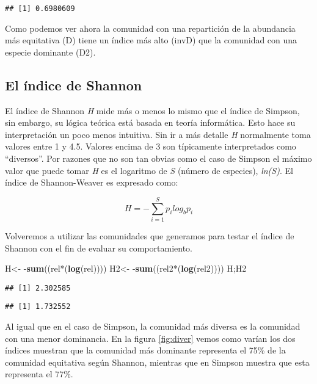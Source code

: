 \documentclass[]{book}
\newenvironment{Shaded}{\begin{snugshade}}{\end{snugshade}}
\newcommand{\KeywordTok}[1]{\textcolor[rgb]{0.13,0.29,0.53}{\textbf{{#1}}}}
\newcommand{\StringTok}[1]{\textcolor[rgb]{0.31,0.60,0.02}{{#1}}}
\newcommand{\NormalTok}[1]{{#1}}
\begin{document}
\begin{verbatim}
## [1] 0.6980609
\end{verbatim}

Como podemos ver ahora la comunidad con una repartición de la abundancia
más equitativa (D) tiene un índice más alto (invD) que la comunidad con
una especie dominante (D2).

\subsection{El índice de Shannon}\label{el-indice-de-shannon}

El índice de Shannon \emph{H} mide más o menos lo mismo que el índice de
Simpson, sin embargo, su lógica teórica está basada en teoría
informática. Esto hace su interpretación un poco menos intuitiva. Sin ir
a más detalle \emph{H} normalmente toma valores entre 1 y 4.5. Valores
encima de 3 son típicamente interpretados como ``diversos''. Por razones
que no son tan obvias como el caso de Simpson el máximo valor que puede
tomar \emph{H} es el logaritmo de \emph{S} (número de especies),
\emph{ln(S)}. El índice de Shannon-Weaver es expresado como:

\[
H=-\sum_{i=1}^S p_ilog_bp_i
\]

Volveremos a utilizar las comunidades que generamos para testar el
índice de Shannon con el fin de evaluar su comportamiento.

\begin{Shaded}
\begin{Highlighting}[]
\NormalTok{H<-}\StringTok{ }\NormalTok{-}\KeywordTok{sum}\NormalTok{((rel*(}\KeywordTok{log}\NormalTok{(rel))))}
\NormalTok{H2<-}\StringTok{ }\NormalTok{-}\KeywordTok{sum}\NormalTok{((rel2*(}\KeywordTok{log}\NormalTok{(rel2))))}
\NormalTok{H;H2}
\end{Highlighting}
\end{Shaded}

\begin{verbatim}
## [1] 2.302585
\end{verbatim}

\begin{verbatim}
## [1] 1.732552
\end{verbatim}

Al igual que en el caso de Simpson, la comunidad más diversa es la
comunidad con una menor dominancia. En la figura \ref{fig:diver} vemos
como varían los dos índices muestran que la comunidad más dominante
representa el 75\% de la comunidad equitativa según Shannon, mientras
que en Simpson muestra que esta representa el 77\%.
\end{document}
